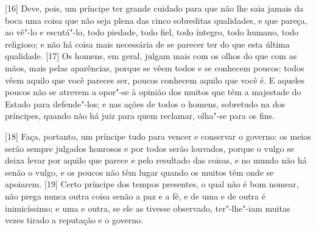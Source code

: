 {[}16{]} Deve, pois, um príncipe ter grande cuidado para que não lhe
saia jamais da boca uma coisa que não seja plena das cinco sobreditas
qualidades, e que pareça, ao vê"-lo e escutá"-lo, todo piedade, todo
fiel, todo íntegro, todo humano, todo religioso; e não há coisa mais
necessária de se parecer ter do que esta última qualidade. {[}17{]} Os
homens, em geral, julgam mais com os olhos do que com as mãos, mais
pelas aparências, porque se vêem todos e se conhecem poucos; todos vêem
aquilo que você pareces ser, poucos conhecem aquilo que você é. E
aqueles poucos não se atrevem a opor"-se à opinião dos muitos que têm a
majestade do Estado para defende"-los; e nas ações de todos o homens,
sobretudo na dos príncipes, quando não há juiz para quem reclamar,
olha"-se para os fins.

{[}18{]} Faça, portanto, um príncipe tudo para vencer e conservar o
governo: os meios serão sempre julgados honrosos e por todos serão
louvados, porque o vulgo se deixa levar por aquilo que parece e pelo
resultado das coisas, e no mundo não há senão o vulgo, e os poucos não
têm lugar quando os muitos têm onde se apoiarem. {[}19{]} Certo
príncipe dos tempos presentes, o qual não é
bom nomear, não prega nunca outra coisa senão a paz e a fé, e de uma e
de outra é inimicíssimo; e uma e outra, se ele as tivesse observado,
ter"-lhe"-iam muitas vezes tirado a reputação e o governo.


